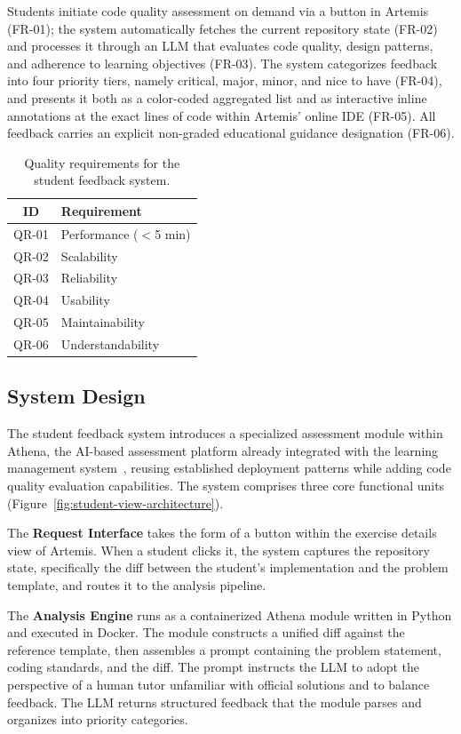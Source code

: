 \documentclass[sigconf]{acmart}
\begin{document}
Students initiate code quality assessment on demand via a button in Artemis (FR-01); the system automatically fetches the current repository state (FR-02) and processes it through an LLM that evaluates code quality, design patterns, and adherence to learning objectives (FR-03). The system categorizes feedback into four priority tiers, namely critical, major, minor, and nice to have (FR-04), and presents it both as a color-coded aggregated list and as interactive inline annotations at the exact lines of code within Artemis' online IDE (FR-05). All feedback carries an explicit non-graded educational guidance designation (FR-06).

\begin{table}[h]
  \caption{Quality requirements for the student feedback system.}
  \label{tab:student-quality-requirements}
  \begin{tabular}{cl}
    \toprule
    \textbf{ID} & \textbf{Requirement} \\
    \midrule
    QR-01 & Performance ($<$5 min) \\
    QR-02 & Scalability \\
    QR-03 & Reliability \\
    QR-04 & Usability \\
    QR-05 & Maintainability \\
    QR-06 & Understandability \\
    \bottomrule
  \end{tabular}
\end{table}

\subsection{System Design}

The student feedback system introduces a specialized assessment module within Athena, the AI-based assessment platform already integrated with the learning management system~\cite{soelch2026scaling}, reusing established deployment patterns while adding code quality evaluation capabilities. The system comprises three core functional units (Figure~\ref{fig:student-view-architecture}).

The \textbf{Request Interface} takes the form of a button within the exercise details view of Artemis. When a student clicks it, the system captures the repository state, specifically the diff between the student's implementation and the problem template, and routes it to the analysis pipeline.

The \textbf{Analysis Engine} runs as a containerized Athena module written in Python and executed in Docker. The module constructs a unified diff against the reference template, then assembles a prompt containing the problem statement, coding standards, and the diff. The prompt instructs the LLM to adopt the perspective of a human tutor unfamiliar with official solutions and to balance feedback. The LLM returns structured feedback that the module parses and organizes into priority categories.
\end{document}
